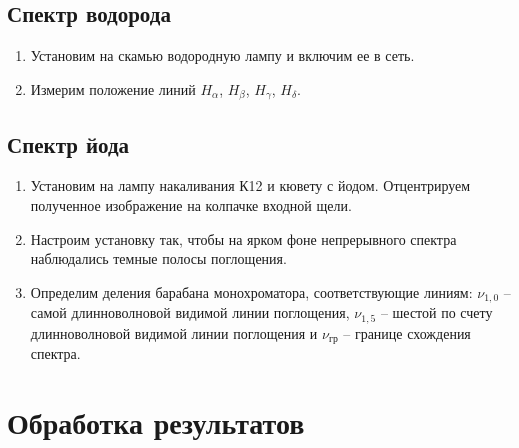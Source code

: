 \documentclass[14pt, a4paper]{report}
\begin{document}
\subsection{Спектр водорода}

\begin{enumerate}

\setcounter{enumi}{0}

\item Установим на скамью водородную лампу и включим ее в сеть.

\item Измерим положение линий $H_\alpha$, $H_\beta$, $H_\gamma$, $H_\delta$.

\end{enumerate}

\subsection{Спектр йода}

\begin{enumerate}

\setcounter{enumi}{0}

\item Установим на лампу накаливания К12 и кювету с йодом. Отцентрируем полученное изображение на колпачке входной щели.

\item Настроим установку так, чтобы на ярком фоне непрерывного спектра наблюдались темные полосы поглощения.

\item Определим деления барабана монохроматора, соответствующие линиям: $\nu_{1,0}$ -- самой длинноволновой видимой линии поглощения, $\nu_{1,5}$ -- шестой по счету длинноволновой видимой линии поглощения и $\nu_{гр}$ -- границе схождения спектра.

\end{enumerate}

\section{Обработка результатов}
\end{document}
